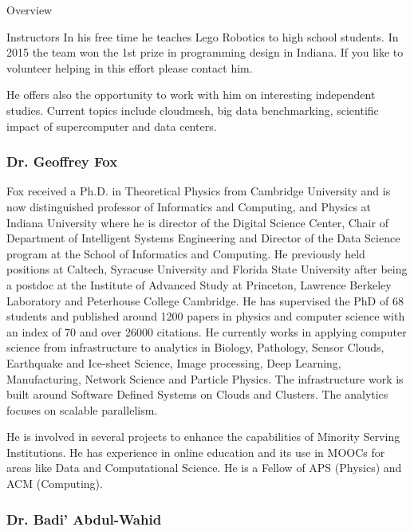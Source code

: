 \begin{edXchapter}{Overview}
\begin{edXsection}{Instructors}
In his free time he teaches Lego Robotics to high school students. In
2015 the team won the 1st prize in programming design in Indiana. If you
like to volunteer helping in this effort please contact him.

He offers also the opportunity to work with him on interesting
independent studies. Current topics include cloudmesh, big data
benchmarking, scientific impact of supercomputer and data centers.

\subsubsection{Dr. Geoffrey Fox}\label{dr.-geoffrey-fox}


Fox received a Ph.D. in Theoretical Physics from Cambridge University
and is now distinguished professor of Informatics and Computing, and
Physics at Indiana University where he is director of the Digital
Science Center, Chair of Department of Intelligent Systems Engineering
and Director of the Data Science program at the School of Informatics
and Computing. He previously held positions at Caltech, Syracuse
University and Florida State University after being a postdoc at the
Institute of Advanced Study at Princeton, Lawrence Berkeley Laboratory
and Peterhouse College Cambridge. He has supervised the PhD of 68
students and published around 1200 papers in physics and computer
science with an index of 70 and over 26000 citations. He currently works
in applying computer science from infrastructure to analytics in
Biology, Pathology, Sensor Clouds, Earthquake and Ice-sheet Science,
Image processing, Deep Learning, Manufacturing, Network Science and
Particle Physics. The infrastructure work is built around Software
Defined Systems on Clouds and Clusters. The analytics focuses on
scalable parallelism.

He is involved in several projects to enhance the capabilities of
Minority Serving Institutions. He has experience in online education and
its use in MOOCs for areas like Data and Computational Science. He is a
Fellow of APS (Physics) and ACM (Computing).

\subsubsection{Dr. Badi' Abdul-Wahid}\label{dr.-badi-abdul-wahid}



\end{edXsection}
\end{edXchapter}
